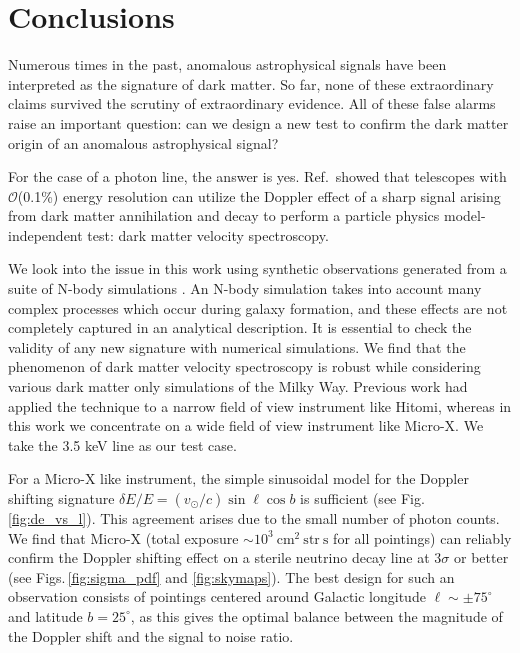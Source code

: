 \documentclass[aps,prd,10pt,twocolumn,superscriptaddress,showpacs,footinbib]{revtex4-1}
\newcommand{\units}[1]{~\mathrm{#1}}
\begin{document}
\section{Conclusions}
\label{sec:conclusions}

Numerous times in the past, anomalous astrophysical signals have been interpreted as the signature of dark matter.  So far, none of these extraordinary claims survived the scrutiny of extraordinary evidence.  All of these false alarms raise an important question:  can we design a new test to confirm the dark matter origin of an anomalous astrophysical signal?  

For the case of a photon line, the answer is yes.  Ref.\,\cite{speckhard2016} showed that telescopes with $\mathcal{O}$(0.1\%) energy resolution can utilize the Doppler effect of a sharp signal arising from dark matter annihilation and decay to perform a particle physics model-independent test: dark matter velocity spectroscopy.

We look into the issue in this work using synthetic observations generated from a suite
of N-body simulations \cite{mao2015}.  An N-body simulation takes into account many complex processes which occur during galaxy formation, and these effects are not completely captured in an analytical description.  It is essential to check the validity of any new signature with  numerical simulations.  We find that the phenomenon of dark matter velocity spectroscopy is robust while considering various dark matter only simulations of the Milky Way.  Previous work had applied the technique to a narrow field of view instrument like Hitomi, whereas in this work we concentrate on a wide field of view instrument like Micro-X.  We take the 3.5 keV line as our test case. 

 For a Micro-X like instrument, the simple sinusoidal model for the Doppler shifting signature $\delta E/E
= (v_\odot/c) \sin \ell \cos b$ is sufficient (see Fig.\,\ref{fig:de_vs_l}).  This agreement arises due to the small number of photon counts.  We find that Micro-X (total
exposure $\sim10^3\units{cm^2~str~s}$ for all pointings) can reliably confirm the Doppler
shifting effect on a sterile neutrino decay line at $3\sigma$ or better (see Figs.\,\ref{fig:sigma_pdf} and \ref{fig:skymaps}). The best design for such an
observation consists of pointings centered around Galactic longitude $\ell\sim\pm75^\circ$ and
latitude $b=25^\circ$, as this gives the optimal balance between the magnitude of the Doppler shift
and the signal to noise ratio. 
\end{document}
